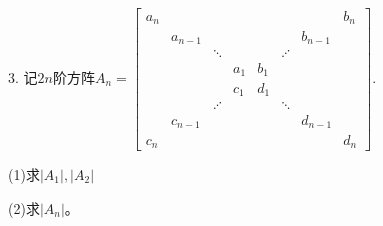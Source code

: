 \documentclass{article}
\begin{document}
3. 记$2n$阶方阵$
A_{n}=
\begin{bmatrix}
  a_{n} & ~  & ~ & ~ & ~ & ~ & ~ & b_{n}\\
  ~ & a_{n-1}  & ~ & ~ & ~ & ~ & b_{n-1} & ~\\
  ~ & ~ & \ddots & ~ & ~ & \iddots  & ~ & ~\\
  ~ & ~ & ~ & a_{1}&b_{1} & ~ & ~ & ~\\
  ~ & ~ & ~ & c_{1}&d_{1} & ~ & ~ & ~\\
  ~ & ~ & \iddots & ~ & ~ & \ddots  & ~ & ~\\
  ~ & c_{n-1}  & ~ & ~ & ~ & ~ & d_{n-1} & ~\\
  c_{n} & ~  & ~ & ~ & ~ & ~ & ~ & d_{n}
\end{bmatrix}
$.

(1)求$|A_{1}|,|A_{2}|$

(2)求$|A_{n}|$。
\end{document}
